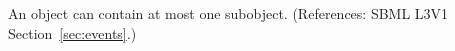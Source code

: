 An \Event object can contain at most one \ListOfEventAssignments
subobject. (References: SBML L3V1 Section~\ref{sec:events}.)
